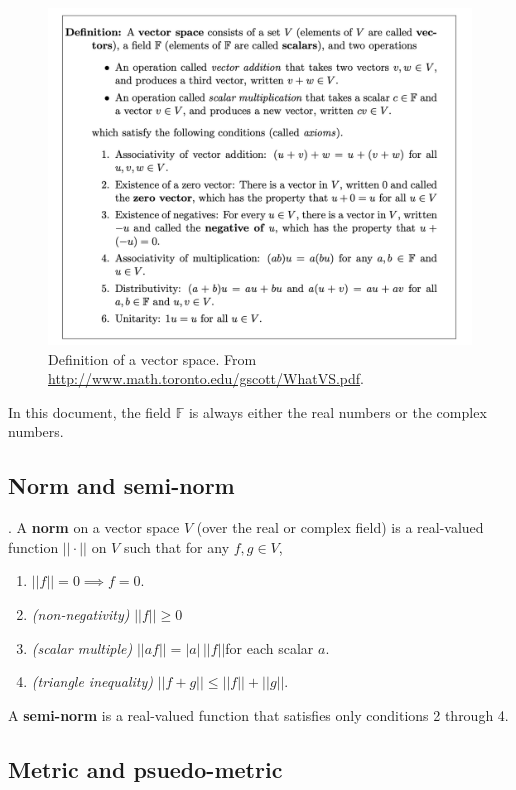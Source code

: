 \documentclass{article} %
\begin{document}
\begin{figure}[H]
\centering 
\includegraphics[width=.8\textwidth]{images/def_vector_space}
\caption{Definition of a vector space.  From \url{http://www.math.toronto.edu/gscott/WhatVS.pdf}.}
\label{fig:def_vector_space}
\end{figure}

In this document, the field $\mathbb{F}$ is always either the real numbers or the complex numbers.  

\subsection{Norm and semi-norm} \label{sec:norm_and_semi_norm}


\begin{definition} \cite[pp.87]{ash2000probability}. 
A \textbf{norm} on a vector space $V$ (over the real or complex field) is a real-valued function $|| \cdot||$ on $V$ such that for any $f,g \in V$,
\begin{enumerate}
\item $||f|| =0 \implies f=0$.
\item \textit{(non-negativity)} $||f|| \geq 0$
\item \textit{(scalar multiple)} $||af|| = |a| \, ||f||$for each scalar $a$.
\item \textit{(triangle inequality)} $||f+g|| \leq ||f|| + ||g||$.
\end{enumerate}
A \textbf{semi-norm} is a real-valued function that satisfies only conditions 2 through 4.
\label{def:norm_and_semi_norm}
\end{definition}

\subsection{Metric and psuedo-metric} \label{sec:metric_and_psuedometric}
\end{document}
